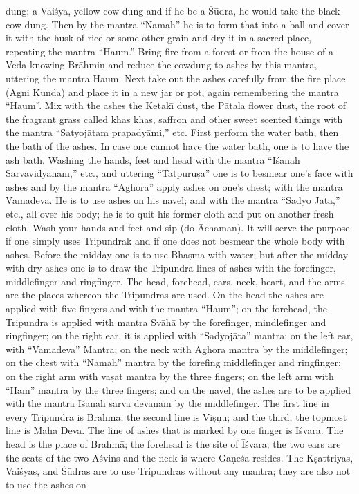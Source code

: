 dung; a Vai\'sya, yellow cow dung and if he be a \'S\=udra, he would take the black cow dung. Then by the mantra ``Namah'' he is to form that into a ball and cover it with the husk of rice or some other grain and dry it in a sacred place, repeating the mantra ``Haum.'' Bring fire from a forest or from the house of a Veda-knowing Br\=ahmi\d{n} and reduce the cowdung to ashes by this mantra, uttering the mantra Haum. Next take out the ashes carefully from the fire place (Agni Kunda) and place it in a new jar or pot, again remembering the mantra ``Haum''. Mix with the ashes the Ketak\={\i} dust, the P\=atala flower dust, the root of the fragrant grass called khas khas, saffron and other sweet scented things with the mantra ``Satyoj\=atam prapady\=ami,'' etc. First perform the water bath, then the bath of the ashes. In case one cannot have the water bath, one is to have the ash bath. Washing the hands, feet and head with the mantra ``I\'s\=anah Sarvavidy\=an\=am,'' etc., and uttering ``Tatpuru\d{s}a'' one is to besmear one's face with ashes and by the mantra ``Aghora'' apply ashes on one's chest; with the mantra V\=amadeva. He is to use ashes on his navel; and with the mantra ``Sadyo J\=ata,'' etc., all over his body; he is to quit his former cloth and put on another fresh cloth. Wash your hands and feet and sip (do \=Achaman). It will serve the purpose if one simply uses Tripundrak and if one does not besmear the whole body with ashes. Before the midday one is to use Bha\d{s}ma with water; but after the midday with dry ashes one is to draw the Tripundra lines of ashes with the forefinger, middlefinger and ringfinger. The head, forehead, ears, neck, heart, and the arms are the places whereon the Tripundras are used. On the head the ashes are applied with five fingers and with the mantra ``Haum''; on the forehead, the Tripundra is applied with mantra Sv\=ah\=a by the forefinger, mindlefinger and ringfinger; on the right ear, it is applied with ``Sadyoj\=ata'' mantra; on the left ear, with ``Vamadeva'' Mantra; on the neck with Aghora mantra by the middlefinger; on the chest with ``Namah'' mantra by the forefing middlefinger and ringfinger; on the right arm with va\d{s}at mantra by the three fingers; on the left arm with ``Ham'' mantra by the three fingers; and on the navel, the ashes are to be applied with the mantra \=I\'s\=anah sarva dev\=an\=am by the middlefinger. The first line in every Tripundra is Brahm\=a; the second line is Vi\d{s}\d{n}u; and the third, the topmost line is Mah\=a Deva. The line of ashes that is marked by one finger is \=I\'svara. The head is the place of Brahm\=a; the forehead is the site of \=I\'svara; the two ears are the seats of the two A\'svins and the neck is where Ga\d{n}e\'sa resides. The K\d{s}attriyas, Vai\'syas, and \'S\=udras are to use Tripundras without any mantra; they are also not to use the ashes on


